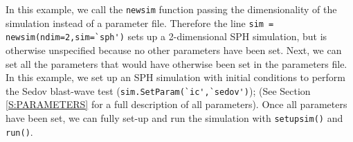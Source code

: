 \documentclass[a4paper]{article}
\newcommand{\var}[1]{\texttt{#1}}
\begin{document}





\noindent In this example, we call the \var{newsim} function passing the dimensionality of the simulation instead of a parameter file.  Therefore the line \lstinline{sim = newsim(ndim=2,sim=`sph')} sets up a 2-dimensional SPH simulation, but is otherwise unspecified because no other parameters have been set.  Next, we can set all the parameters that would have otherwise been set in the parameters file.  In this example, we set up an SPH simulation with initial conditions to perform the Sedov blast-wave test (\lstinline{sim.SetParam(`ic',`sedov')}); (See Section \ref{S:PARAMETERS} for a full description of all parameters).  Once all parameters have been set, we can fully set-up and run the simulation with \lstinline{setupsim()} and \lstinline{run()}.


\end{document}
